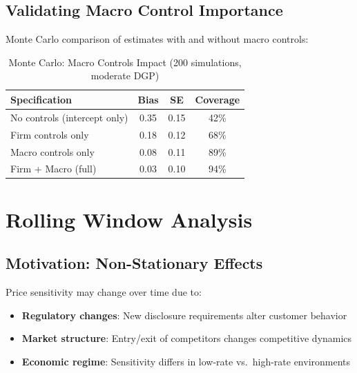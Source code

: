 \subsection{Validating Macro Control Importance}

Monte Carlo comparison of estimates with and without macro controls:

\begin{table}[htbp]
\centering
\caption{Monte Carlo: Macro Controls Impact (200 simulations, moderate DGP)}
\label{tab:macro_monte_carlo}
\begin{tabular}{lccc}
\hline
\textbf{Specification} & \textbf{Bias} & \textbf{SE} & \textbf{Coverage} \\
\hline
No controls (intercept only) & 0.35 & 0.15 & 42\% \\
Firm controls only & 0.18 & 0.12 & 68\% \\
Macro controls only & 0.08 & 0.11 & 89\% \\
Firm + Macro (full) & 0.03 & 0.10 & 94\% \\
\hline
\end{tabular}
\end{table}


\section{Rolling Window Analysis}\label{sec:ch08_rolling_window}

\subsection{Motivation: Non-Stationary Effects}

Price sensitivity may change over time due to:
\begin{itemize}
    \item \textbf{Regulatory changes}: New disclosure requirements alter customer behavior
    \item \textbf{Market structure}: Entry/exit of competitors changes competitive dynamics
    \item \textbf{Economic regime}: Sensitivity differs in low-rate vs.\ high-rate environments
\end{itemize}

